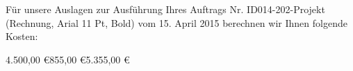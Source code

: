 %
% 
% 
%



\newcommand{\Absender}{%
    \UniversitaetName \\
    \UniversitaetAdresse \\
    2.~Adresszeile erscheint automatisch
}
\newcommand{\EmpfaengerAdresse}{%
    Fa. Muster Mechanik\\
    Herrn Max Mustermann\\
    Musterstraße 12\\
    12345 München\\
    ~\\
    Adressfeld mit bis zu 6 Zeilen
}
\newcommand{\Datum}{Datum} %
\newcommand{\RechnungNummer}{ID014-202-Projekt (Rechnung, Arial 11 Pt, Bold)}
\newcommand{\RechnungBearbeitungskennzeichen}{1234.5678.9012}




Für unsere Auslagen zur Ausführung Ihres Auftrags Nr. \RechnungNummer{} vom
15. April 2015 berechnen wir Ihnen folgende Kosten:

\begin{RechnungTabelle}{4.500,00 \euro}{855,00 \euro}{5.355,00 \euro}
\RechnungTabelleLinie
{}
\end{RechnungTabelle}

